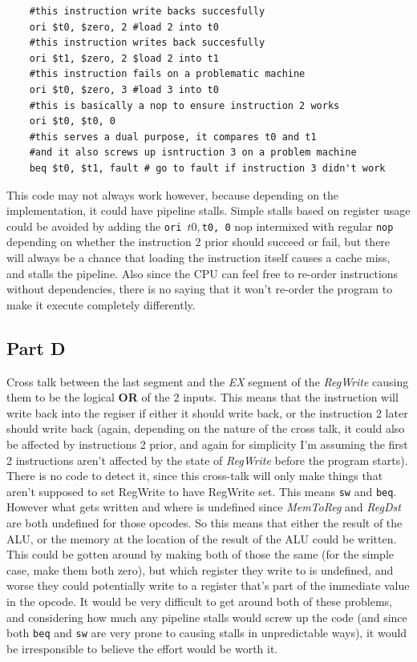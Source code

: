 \documentclass[11pt]{article} %
\newcommand{\strong}[1]{\textbf{#1}}
\newcommand{\code}[1]{\texttt{#1}}
\begin{document}
\begin{verbatim}
    #this instruction write backs succesfully
    ori $t0, $zero, 2 #load 2 into t0
    #this instruction writes back succesfully
    ori $t1, $zero, 2 $load 2 into t1
    #this instruction fails on a problematic machine
    ori $t0, $zero, 3 #load 3 into t0
    #this is basically a nop to ensure instruction 2 works
    ori $t0, $t0, 0
    #this serves a dual purpose, it compares t0 and t1
    #and it also screws up isntruction 3 on a problem machine
    beq $t0, $t1, fault # go to fault if instruction 3 didn't work
\end{verbatim}

This code may not always work however, because depending on the implementation, it could have pipeline stalls. Simple stalls based on register usage could be avoided by adding the \code{ori $t0, $t0, 0} nop intermixed with regular \code{nop} depending on whether the instruction 2 prior should succeed or fail, but there will always be a chance that loading the instruction itself causes a cache miss, and stalls the pipeline. Also since the CPU can feel free to re-order instructions without dependencies, there is no saying that it won't re-order the program to make it execute completely differently.

\subsection{Part D}

Cross talk between the last segment and the \emph{EX} segment of the \emph{RegWrite} causing them to be the logical \strong{OR} of the 2 inputs. This means that the instruction will write back into the regiser if either it should write back, or the instruction 2 later should write back (again, depending on the nature of the cross talk, it could also be affected by instructions 2 prior, and again for simplicity I'm assuming the first 2 instructions aren't affected by the state of \emph{RegWrite} before the program starts). There is no code to detect it, since this cross-talk will only make things that aren't supposed to set RegWrite to have RegWrite set. This means \code{sw} and \code{beq}. However what gets written and where is undefined since \emph{MemToReg} and \emph{RegDst} are both undefined for those opcodes. So this means that either the result of the ALU, or the memory at the location of the result of the ALU could be written. This could be gotten around by making both of those the same (for the simple case, make them both zero), but which register they write to is undefined, and worse they could potentially write to a register that's part of the immediate value in the opcode. It would be very difficult to get around both of these problems, and considering how much any pipeline stalls would screw up the code (and since both \code{beq} and \code{sw} are very prone to causing stalls in unpredictable ways), it would be irresponsible to believe the effort would be worth it.
\end{document}

